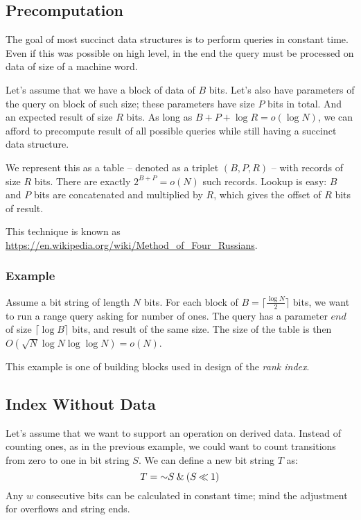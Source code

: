 \subsection{Precomputation}

The goal of most succinct data structures is to perform queries in constant time.
Even if this was possible on high level, in the end the query must be processed on data of size of a machine word.

Let's assume that we have a block of data of $B$ bits.
Let's also have parameters of the query on block of such size; these parameters have size $P$ bits in total.
And an expected result of size $R$ bits.
As long as $B+P+\log R = o(\log N)$, we can afford to precompute result of all possible queries while still having a succinct data structure.

We represent this as a table -- denoted as a triplet $(B, P, R)$ -- with records of size $R$ bits.
There are exactly $2^{B+P} = o(N)$ such records.
Lookup is easy: $B$ and $P$ bits are concatenated and multiplied by $R$, which gives the offset of $R$ bits of result.

This technique is known as \url{https://en.wikipedia.org/wiki/Method_of_Four_Russians}.

\subsubsection{\label{sss:precomputation-example}Example}

Assume a bit string of length $N$ bits.
For each block of $B = \lceil\frac{\log N}{2}\rceil$ bits, we want to run a range query asking for number of ones.
The query has a parameter $end$ of size $\lceil \log {B} \rceil$ bits, and result of the same size.
The size of the table is then $O(\sqrt{N} \log N \log\log N) = o(N)$.

This example is one of building blocks used in design of the \emph{rank index}.

\subsection{\label{ss:index-without-data}Index Without Data}

Let's assume that we want to support an operation on derived data.
Instead of counting ones, as in the previous example, we could want to count transitions from zero to one in bit string $S$.
We can define a new bit string $T$ as:
$$ T = \mathord{\sim} S \mathbin{\&} (S \mathbin{\ll} 1)$$
Any $w$ consecutive bits can be calculated in constant time; mind the adjustment for overflows and string ends.

